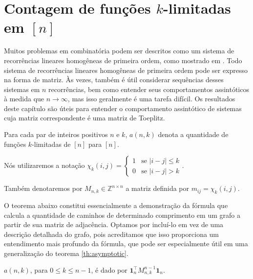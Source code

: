 \section{Contagem de funções \texorpdfstring{$k$}{k}-limitadas em \texorpdfstring{$[n]$}{[n]}} \vspace{1cm} Muitos problemas em combinatória podem ser descritos como um sistema de recorrências lineares homogêneas de primeira ordem, como mostrado em \cite{coulson}. Todo sistema de recorrências lineares homogêneas de primeira ordem pode ser expresso na forma de matriz. Às vezes, também é útil considerar sequências desses sistemas em $n$ recorrências, bem como entender seus comportamentos assintóticos à medida que $n \to \infty$, mas isso geralmente é uma tarefa difícil. Os resultados deste capítulo são úteis para entender o comportamento assintótico de sistemas cuja matriz correspondente é uma matriz de Toeplitz.

Para cada par de inteiros positivos $n$ e $k$, $a(n,k)$ denota a quantidade de funções $k$-limitadas de $[n]$ para $[n]$.

Nós utilizaremos a notação $\chi_k(i, j) = \begin{cases} 1 & \text{se } \lvert i - j\rvert \le k \\ 0 & \text{se } \lvert i - j\rvert > k \end{cases}$.

Também denotaremos por $M_{n,k} \in \mathbb{Z}^{n \times n}$ a matriz definida por $m_{ij} = \chi_k(i, j)$.

O teorema abaixo constitui essencialmente a demonstração da fórmula que calcula a quantidade de caminhos de determinado comprimento em um grafo a partir de sua matriz de adjacência. Optamos por incluí-lo em vez de uma descrição detalhada do grafo, pois acreditamos que isso proporciona um entendimento mais profundo da fórmula, que pode ser especialmente útil em uma generalização do teorema \ref{th:asymptotic}.

\begin{theorem} \label{th:matrix-form-n-to-n} $a(n,k)$, para $0 \le k \le n - 1$, é dado por $\mathbf{1}_n^\intercal M_{n,k}^{n-1} \mathbf{1}_n$. \end{theorem}

